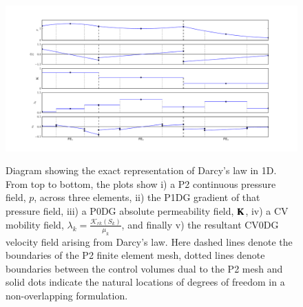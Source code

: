 \clearpage


\begin{figure}[htp]
\begin{center}
\hbox{\hspace{-2.cm}
\includegraphics[width=1.3\textwidth,height=1.3\textwidth]{diagrams/overlapping_cartoon}}
\vspace{-1.4cm}
\caption{Diagram showing the exact representation of Darcy's law in 1D. From top to bottom, the plots show i) a P2 continuous pressure field, $p$, across three elements, ii) the P1DG gradient of that  pressure field, iii) a P0DG absolute permeability field, ${\bf K}$, iv) a CV mobility field, $\lambda_{k}=\frac{\mathcal{K}_{rk}\left(S_{k}\right)}{\mu_{k}}$, and finally v) the resultant CV0DG velocity field arising from Darcy's law. Here dashed lines denote the boundaries of the P2 finite element mesh, dotted lines denote boundaries between the control volumes dual to the P2 mesh and solid dots indicate the natural locations of degrees of freedom in a non-overlapping formulation. }
\label{fig:darcys_law}
\end{center}
\end{figure}

